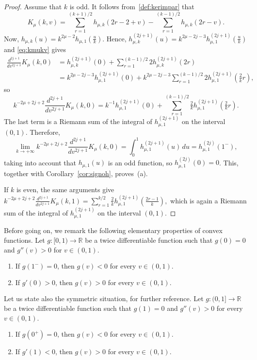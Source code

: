 \documentclass[10pt,a4paper]{article}
\numberwithin{equation}{section}
\theoremstyle{plain}
\theoremstyle{definition}
\newcommand{\RR}{\mathbb{R}}
\begin{document}
\begin{proof}
Assume that $k$ is odd.
It follows from~\eqref{def:kerimpar} that
\begin{equation}
\label{eq:kmukv}
   K_\mu(k,v) = \sum\limits_{r=1}^{(k+1)/2} h_{\mu,k} (2r-2+v)
   - \sum\limits_{r=1}^{(k-1)/2} h_{\mu,k} (2r-v).
\end{equation}
Now,
$
   h_{\mu,k}(u) =
   k^{2\mu-2} h_{\mu,1}(\tfrac{u}{k}).
$
Hence,
$
   h_{\mu,k}^{(2j+1)}(u) = k^{2\mu - 2j - 3} h_{\mu,1}^{(2j+1)}(\tfrac{u}{k})
$
and \eqref{eq:kmukv} gives
\begin{align*}
   \frac{d^{2j+1}}{dv^{2j+1}} K_\mu(k,0)
   &= h_{\mu,k}^{(2j+1)}(0) + \sum_{r=1}^{(k-1)/2} 2 h_{\mu,k}^{(2j+1)}(2r)
   \\
   &= k^{2\mu-2j-3} h_{\mu,1}^{(2j+1)}(0)
   + k^{2\mu-2j-3} \sum_{r=1}^{(k-1)/2} 2 h_{\mu,1}^{(2j+1)}(\tfrac{2}{k}r),
\end{align*}
so
\[
   k^{-2\mu + 2j +2} \frac{d^{2j+1}}{dv^{2j+1}} K_\mu(k,0)
   = k^{-1} h_{\mu,1}^{(2j+1)}(0)
   + \sum_{r=1}^{(k-1)/2} \tfrac{2}{k} h_{\mu,1}^{(2j+1)}(\tfrac{2}{k} r).
\]
The last term is a Riemann sum of the integral of $h_{\mu,1}^{(2j+1)}$ on the interval $(0,1)$. Therefore,
\[
   \lim_{k \to +\infty} k^{-2\mu + 2j +2} \frac{d^{2j+1}}{dv^{2j+1}} K_\mu(k,0)
   = \int_0^1 h_{\mu,1}^{(2j+1)}(u) \, du
   = h_{\mu,1}^{(2j)}(1^-),
\]
taking into account that $h_{\mu,1}(u)$ is an odd function, so $h_{\mu,1}^{(2j)}(0) = 0$. This, together with Corollary~\ref{cor:signoh}, proves~(a).

If $k$ is even, the same arguments give
$
   k^{-2\mu + 2j +2} \frac{d^{2j+1}}{dv^{2j+1}} K_\mu(k,1)
   = \sum_{r=1}^{k/2} \frac{2}{k} h_{\mu,1}^{(2j+1)}(\frac{2r-1}{k}),
$
which is again a Riemann sum of the integral of $h_{\mu,1}^{(2j+1)}$ on the interval $(0,1)$.
\end{proof}

Before going on, we remark the following elementary properties of convex functions. Let $g : [0,1) \to \RR$ be a twice differentiable function such that $g(0) = 0$ and $g''(v) > 0$ for $v \in (0,1)$.
\begin{enumerate}
\item[(a)] If $g(1^-) = 0$, then $g(v) < 0$ for every $v \in (0,1)$.
\item[(b)] If $g'(0) > 0$, then $g(v) > 0$ for every $v \in (0,1)$.
\end{enumerate}
Let us state also the symmetric situation, for further reference. Let $g : (0,1] \to \RR$ be a twice differentiable function such that $g(1) = 0$ and $g''(v) > 0$ for every $v \in (0,1)$.
\begin{enumerate}
\item[(a)] If $g(0^+) = 0$, then $g(v) < 0$ for every $v \in (0,1)$.
\item[(b)] If $g'(1) < 0$, then $g(v) > 0$ for every $v \in (0,1)$.
\end{enumerate}
\end{document}
